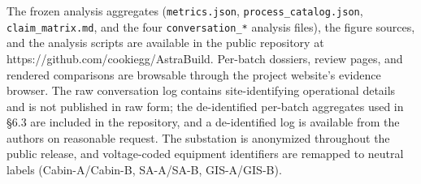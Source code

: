 \documentclass[10pt,a4paper]{article}
\begin{document}
The frozen analysis aggregates (\texttt{metrics.json},
\texttt{process\_catalog.json}, \texttt{claim\_matrix.md}, and the four
\texttt{conversation\_*} analysis files), the figure sources, and the
analysis scripts are available in the public repository at
https://github.com/cookiegg/AstraBuild. Per-batch dossiers, review
pages, and rendered comparisons are browsable through the project
website's evidence browser. The raw conversation log contains
site-identifying operational details and is not published in raw form;
the de-identified per-batch aggregates used in §6.3 are included in the
repository, and a de-identified log is available from the authors on
reasonable request. The substation is anonymized throughout the public
release, and voltage-coded equipment identifiers are remapped to neutral
labels (Cabin-A/Cabin-B, SA-A/SA-B, GIS-A/GIS-B).
\small


\end{document}
